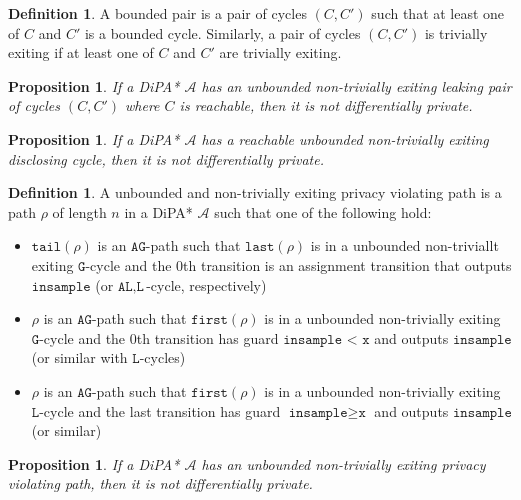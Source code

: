 \documentclass[12pt]{article}
\newtheorem{prop}[thm]{Proposition}
\theoremstyle{definition}
\newtheorem{defn}[thm]{Definition}
\begin{document}
\begin{defn}
	A bounded pair is a pair of cycles $(C, C')$ such that at least one of $C$ and $C'$ is a bounded cycle. Similarly, a pair of cycles $(C, C')$ is trivially exiting if at least one of $C$ and $C'$ are trivially exiting.
\end{defn}

\begin{prop}
	If a DiPA* $\mathcal{A}$ has an unbounded non-trivially exiting leaking pair of cycles $(C, C')$ where $C$ is reachable, then it is not differentially private.
\end{prop}

\begin{prop}
	If a DiPA* $\mathcal{A}$ has a reachable unbounded non-trivially exiting disclosing cycle, then it is not differentially private.
\end{prop}

\begin{defn}
	A unbounded and non-trivially exiting privacy violating path is a path $\rho$ of length $n$ in a DiPA* $\mathcal{A}$ such that one of the following hold:

\begin{itemize}
	\item $\texttt{tail}(\rho)$ is an $\texttt{AG}$-path such that $\texttt{last}(\rho)$ is in a unbounded non-triviallt exiting $\texttt{G}$-cycle and the 0th transition is an assignment transition that outputs $\texttt{insample}$ (or $\texttt{AL}, \texttt{L}$-cycle, respectively)
	\item $\rho$ is an $\texttt{AG}$-path such that $\texttt{first}(\rho)$ is in a unbounded non-trivially exiting $\texttt{G}$-cycle and the 0th transition has guard $\texttt{insample < x}$ and outputs $\texttt{insample}$ (or similar with $\texttt{L}$-cycles)
	\item $\rho$ is an $\texttt{AG}$-path such that $\texttt{first}(\rho)$ is in a unbounded non-trivially exiting $\texttt{L}$-cycle and the last transition has guard $\texttt{insample} \geq \texttt{x}$ and outputs $\texttt{insample}$ (or similar)

\end{itemize}
\end{defn}

\begin{prop}
	If a DiPA* $\mathcal{A}$ has an unbounded non-trivially exiting privacy violating path, then it is not differentially private.
\end{prop}
\end{document}
